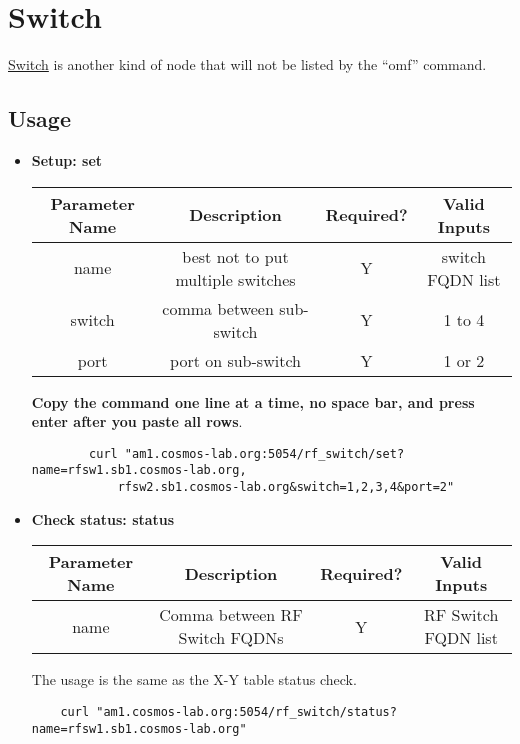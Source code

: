\documentclass{article}
\begin{document}
            
\section{Switch}
    \href{https://wiki.cosmos-lab.org/wiki/Architecture/Domains/cosmos_sb1#RFPathConfigurationsformmWaveDevelopmentPlatforms}{Switch} is another kind of node that will not be listed by the ``omf'' command. 
    
    \subsection{Usage}
    \begin{itemize}
        \item \textbf{Setup: set}
        
            \begin{tabular}{|c|c|c|c|}
                \hline
                \textbf{Parameter Name} & \textbf{Description} & \textbf{Required?} & \textbf{Valid Inputs}\\
                \hline\hline
                name & best not to put multiple switches & Y & switch FQDN list \\
                \hline
                switch & comma between sub-switch & Y & 1 to 4 \\
                \hline
                port & port on sub-switch & Y & 1 or 2 \\ [1ex]
                \hline
            \end{tabular}

            \textbf{Copy the command one line at a time, no space bar, and press enter after you paste all rows}. 
            \begin{verbatim}
        curl "am1.cosmos-lab.org:5054/rf_switch/set?name=rfsw1.sb1.cosmos-lab.org,
            rfsw2.sb1.cosmos-lab.org&switch=1,2,3,4&port=2"
            \end{verbatim}
            
            
        \item \textbf{Check status: status}
            
            \begin{tabular}{|c|c|c|c|}
                \hline
                \textbf{Parameter Name} & \textbf{Description} & \textbf{Required?} & \textbf{Valid Inputs}\\
                \hline\hline
                name & Comma between RF Switch FQDNs & Y & RF Switch FQDN list \\ [1ex]
                \hline
            \end{tabular}
            
            The usage is the same as the X-Y table status check. 
            \begin{verbatim}
    curl "am1.cosmos-lab.org:5054/rf_switch/status?name=rfsw1.sb1.cosmos-lab.org"
            \end{verbatim}
    \end{itemize}
\end{document}
